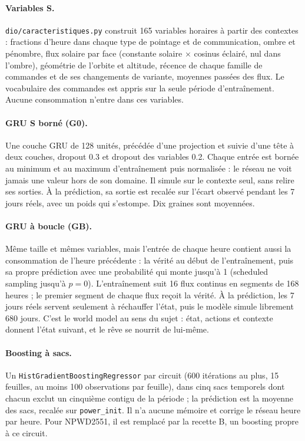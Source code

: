 \documentclass[11pt,a4paper]{article}
\newcommand{\code}[1]{\texttt{#1}}
\begin{document}
\paragraph{Variables S.} \code{dio/caracteristiques.py} construit 165 variables horaires à partir des contextes : fractions d'heure dans chaque type de pointage et de communication, ombre et pénombre, flux solaire par face (constante solaire × cosinus éclairé, nul dans l'ombre), géométrie de l'orbite et altitude, récence de chaque famille de commandes et de ses changements de variante, moyennes passées des flux. Le vocabulaire des commandes est appris sur la seule période d'entraînement. Aucune consommation n'entre dans ces variables.

\paragraph{GRU S borné (G0).} Une couche GRU de 128 unités, précédée d'une projection et suivie d'une tête à deux couches, dropout 0.3 et dropout des variables 0.2. Chaque entrée est bornée au minimum et au maximum d'entraînement puis normalisée : le réseau ne voit jamais une valeur hors de son domaine. Il simule sur le contexte seul, sans relire ses sorties. À la prédiction, sa sortie est recalée sur l'écart observé pendant les 7 jours réels, avec un poids qui s'estompe. Dix graines sont moyennées.

\paragraph{GRU à boucle (GB).} Même taille et mêmes variables, mais l'entrée de chaque heure contient aussi la consommation de l'heure précédente : la vérité au début de l'entraînement, puis sa propre prédiction avec une probabilité qui monte jusqu'à 1 (scheduled sampling jusqu'à $p = 0$). L'entraînement suit 16 flux continus en segments de 168 heures ; le premier segment de chaque flux reçoit la vérité. À la prédiction, les 7 jours réels servent seulement à réchauffer l'état, puis le modèle simule librement 680 jours. C'est le world model au sens du sujet : état, actions et contexte donnent l'état suivant, et le rêve se nourrit de lui-même.

\paragraph{Boosting à sacs.} Un \code{HistGradientBoostingRegressor} par circuit (600 itérations au plus, 15 feuilles, au moins 100 observations par feuille), dans cinq sacs temporels dont chacun exclut un cinquième contigu de la période ; la prédiction est la moyenne des sacs, recalée sur \code{power\_init}. Il n'a aucune mémoire et corrige le réseau heure par heure. Pour NPWD2551, il est remplacé par la recette B, un boosting propre à ce circuit.
\end{document}
